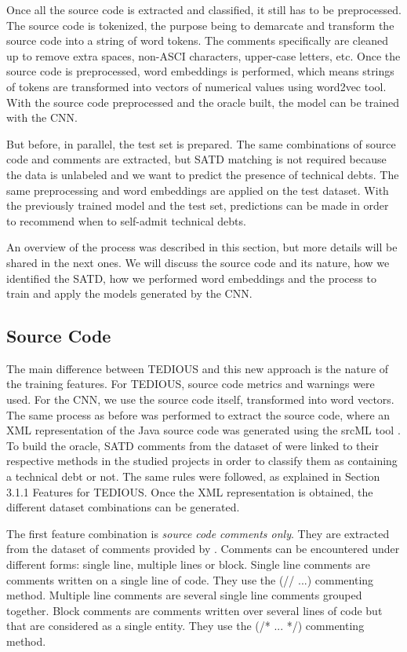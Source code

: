 Once all the source code is extracted and classified, it still has to be preprocessed. The source code is tokenized, the purpose being to demarcate and transform the source code into a string of word tokens. The comments specifically are cleaned up to remove extra spaces, non-ASCI characters, upper-case letters, etc. Once the source code is preprocessed, word embeddings is performed, which means strings of tokens are transformed into vectors of numerical values using word2vec tool. With the source code preprocessed and the oracle built, the model can be trained with the CNN.

But before, in parallel, the test set is prepared. The same combinations of source code and comments are extracted, but SATD matching is not required because the data is unlabeled and we want to predict the presence of technical debts. The same preprocessing and word embeddings are applied on the test dataset. With the previously trained model and the test set, predictions can be made in order to recommend when to self-admit technical debts.

An overview of the process was described in this section, but more details will be shared in the next ones. We will discuss the source code and its nature, how we identified the SATD, how we performed word embeddings and the process to train and apply the models generated by the CNN.

\subsection{Source Code}


The main difference between TEDIOUS and this new approach is the nature of the training features. For TEDIOUS, source code metrics and warnings were used. For the CNN, we use the source code itself, transformed into word vectors. The same process as before was performed to extract the source code, where an XML representation of the Java source code was generated using the srcML tool \citep{Collard2013}. To build the oracle, SATD comments from the dataset of \citet{MaldonadoNLP} were linked to their respective methods in the studied projects in order to classify them as containing a technical debt or not. The same rules were followed, as explained in Section 3.1.1 Features for TEDIOUS. Once the XML representation is obtained, the different dataset combinations can be generated.

The first feature combination is \textit{source code comments only}. They are extracted from the dataset of comments provided by \citet{maldonado17}. Comments can be encountered under different forms: single line, multiple lines or block. Single line comments are comments written on a single line of code. They use the \textsc{(// ...)} commenting method. Multiple line comments are several single line comments grouped together. Block comments are comments written over several lines of code but that are considered as a single entity. They use the \textsc{(/* ... */)} commenting method.

